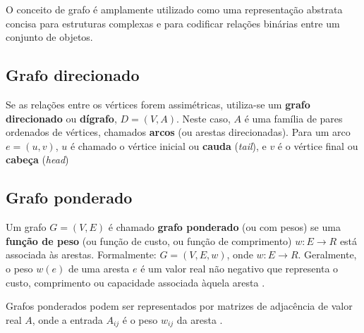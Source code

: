 O conceito de grafo é amplamente utilizado como uma representação abstrata concisa para estruturas complexas e para 
codificar relações binárias entre um conjunto de objetos.

\subsection{Grafo direcionado}
\label{sec:grafo_direcionado}

Se as relações entre os vértices forem assimétricas, utiliza-se um \textbf{grafo direcionado} ou \textbf{dígrafo}, $D=(V,A)$. 
Neste caso, $A$ é uma família de pares ordenados de vértices, chamados \textbf{arcos} (ou arestas direcionadas). 
Para um arco $e=(u,v)$, $u$ é chamado o vértice inicial ou \textbf{cauda} (\textit{tail}), e $v$ é o vértice final ou \textbf{cabeça} (\textit{head})
\cite{manber}

\subsection{Grafo ponderado}

Um grafo $G=(V,E)$ é chamado \textbf{grafo ponderado} (ou com pesos) se uma \textbf{função de peso} (ou função de custo, 
ou função de comprimento) $w:E\rightarrow R$ está associada às arestas. Formalmente: $G=(V,E,w)$, onde $w:E\rightarrow R$. 
Geralmente, o peso $w(e)$ de uma aresta $e$ é um valor real não negativo que representa o custo, comprimento ou capacidade 
associada àquela aresta \cite{rosen}.

Grafos ponderados podem ser representados por matrizes de adjacência de valor real $A$, onde a entrada $A_{ij}$ 
é o peso $w_{ij}$ da aresta \cite{path_following_algo}.

